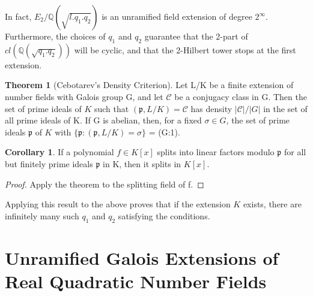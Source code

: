 \documentclass[12pt]{extarticle}
\newcommand{\<}{\langle}
\renewcommand{\>}{\rangle}
\theoremstyle{definition}
\newtheorem{theorem}{Theorem}
\newtheorem{corollary}{Corollary}
\begin{document}
\begin{center}
\end{center}
In fact, $E_2/\mathbb{Q}(\sqrt{l.q_1.q_2})$ is an unramified field extension of degree $2^{\infty}$. Furthermore, the choices of $q_1$ and $q_2$ guarantee that the 2-part of $cl(\mathbb{Q}(\sqrt{q_1.q_2}))$ will be cyclic, and that the 2-Hilbert tower stops at the first extension. 
\begin{theorem}[Cebotarev's Density Criterion]
Let L/K be a finite extension of
number fields with Galois group G, and let $\mathcal{C}$ be a conjugacy class in G. Then the set of
prime ideals of $K$ such that $(\mathfrak{p},L/K)=\mathcal{C}$ has density $|\mathcal{C}|/|G|$ in the set of all prime
ideals of K. If G is abelian, then, for a fixed $\sigma\in G$, the set of prime ideals $\mathfrak{p}$ of $K$ with $\{\mathfrak{p}:(\mathfrak{p},L/K)=\sigma\}$  = (G:1).
\end{theorem}
\begin{corollary}
 If a polynomial $f \in K[x]$ splits into linear factors modulo $\mathfrak{p}$ for all but finitely prime ideals $\mathfrak{p}$ in K, then it splits in $K[x]$.
\end{corollary}
\begin{proof}
Apply the theorem to the splitting field of f.
\end{proof}
Applying this result to the above proves that if the extension $K$ exists, there are infinitely many such $q_1$ and $q_2$ satisfying the conditions.


\section{Unramified Galois Extensions of Real Quadratic Number Fields}
\end{document}
